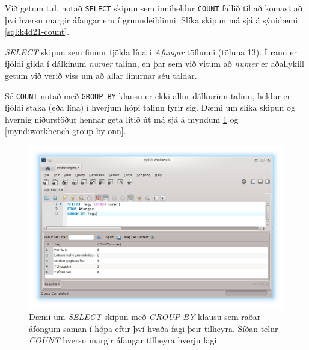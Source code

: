 Við getum t.d. notað \verb|SELECT| skipun sem inniheldur \verb|COUNT| fallið til að komast að því hversu margir áfangar eru í grunndeildinni. Slíka skipun má sjá á sýnidæmi \ref{sql:k4d21-count}.

\begin{example}
\caption[COUNT á dálk]{\emph{SELECT} skipun sem finnur fjölda lína í \emph{Afangar} töflunni (töluna 13). Í raun er fjöldi gilda í dálkinum \emph{numer} talinn, en þar sem við vitum að \emph{numer} er aðallykill getum við verið viss um að allar línurnar séu taldar.}
\label{sql:k4d21-count}
\centering
{}
\end{example}

Sé \verb|COUNT| notað með \verb|GROUP BY| klausu er ekki allur dálkurinn talinn, heldur er fjöldi staka (eða lína) í hverjum hópi talinn fyrir sig. Dæmi um slíka skipun og hvernig niðurstöður hennar geta litið út má sjá á myndum \ref{mynd:workbench-group-by} og \ref{mynd:workbench-group-by-onn}.

\begin{figure}
\caption[GROUP BY og COUNT eftir fögum]{Dæmi um \emph{SELECT} skipun með \emph{GROUP BY} klausu sem raðar áföngum saman í hópa eftir því hvaða fagi þeir tilheyra. Síðan telur \emph{COUNT} hversu margir áfangar tilheyra hverju fagi.}
\label{mynd:workbench-group-by}
\centering
\includegraphics[width=\linewidth]{myndir/workbench-group-by}
\end{figure}

